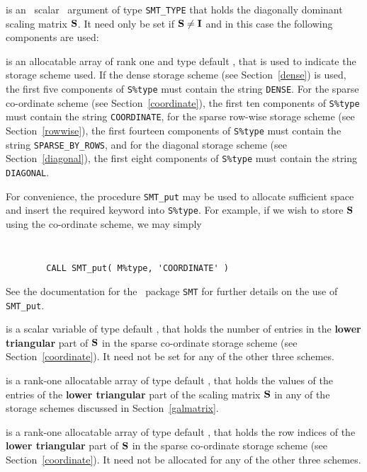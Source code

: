 \documentclass{galahad}
\begin{document}
\begin{description}
 is an \optional\ scalar \intentin\ argument of type {\tt SMT\_TYPE} 
that holds the diagonally dominant scaling matrix ${\mathbf{S}}$. It need only be set 
if ${\mathbf{S}} \neq {\mathbf{I}}$ and in this case the following components are used:

\begin{description}

 is an allocatable array of rank one and type default 
\character, that
is used to indicate the storage scheme used. If the dense storage scheme 
(see Section~\ref{dense}) is used, 
the first five components of {\tt S\%type} must contain the
string {\tt DENSE}.
For the sparse co-ordinate scheme (see Section~\ref{coordinate}), 
the first ten components of {\tt S\%type} must contain the
string {\tt COORDINATE},  
for the sparse row-wise storage scheme (see Section~\ref{rowwise}),
the first fourteen components of {\tt S\%type} must contain the
string {\tt SPARSE\_BY\_ROWS},
and for the diagonal storage scheme (see Section~\ref{diagonal}),
the first eight components of {\tt S\%type} must contain the
string {\tt DIAGONAL}.

For convenience, the procedure {\tt SMT\_put} 
may be used to allocate sufficient space and insert the required keyword
into {\tt S\%type}.
For example, if we wish to store ${\mathbf{S}}$ using the co-ordinate scheme,
we may simply
{\tt 
\begin{verbatim}
        CALL SMT_put( M%type, 'COORDINATE' )
\end{verbatim}
}
\noindent
See the documentation for the \galahad\ package {\tt SMT} 
for further details on the use of {\tt SMT\_put}.

 is a scalar variable of type default \integer, that 
holds the number of entries in the {\bf lower triangular} part of ${\mathbf{S}}$
in the sparse co-ordinate storage scheme (see Section~\ref{coordinate}). 
It need not be set for any of the other three schemes.

 is a rank-one allocatable array of type default \realdp, that holds
the values of the entries of the {\bf lower triangular} part
of the scaling matrix ${\mathbf{S}}$ in any of the 
storage schemes discussed in Section~\ref{galmatrix}.

 is a rank-one allocatable array of type default \integer,
that holds the row indices of the {\bf lower triangular} part of ${\mathbf{S}}$ 
in the sparse co-ordinate storage
scheme (see Section~\ref{coordinate}). 
It need not be allocated for any of the other three schemes.


\end{description}
\end{description}
\end{document}
